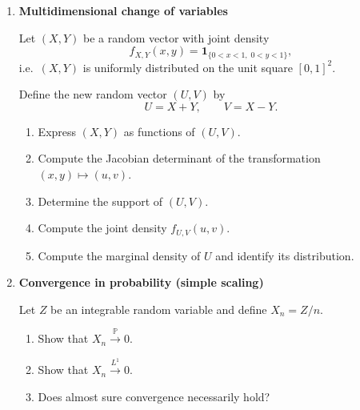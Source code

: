 \documentclass[11pt]{article}
\begin{document}
\begin{enumerate}
Let $R=(R_1,R_2)$ be asset returns with
\[
\mathbb{E}[R]=
\begin{pmatrix}0.05\\0.02\end{pmatrix},
\qquad
\Sigma=
\begin{pmatrix}
0.04 & 0.01\\
0.01 & 0.01
\end{pmatrix}.
\]

A portfolio has weights $w=(0.6,0.4)$.

\begin{enumerate}
\item Compute the expected portfolio return.
\item Compute the portfolio variance.
\item Interpret the effect of correlation.
\end{enumerate}

\bigskip

\item \textbf{Multidimensional change of variables}

Let $(X,Y)$ be a random vector with joint density
\[
f_{X,Y}(x,y)=\mathbf{1}_{\{0<x<1,\;0<y<1\}},
\]
i.e.\ $(X,Y)$ is uniformly distributed on the unit square $[0,1]^2$.

Define the new random vector $(U,V)$ by
\[
U = X+Y,
\qquad
V = X-Y.
\]

\begin{enumerate}
\item Express $(X,Y)$ as functions of $(U,V)$.
\item Compute the Jacobian determinant of the transformation $(x,y)\mapsto(u,v)$.
\item Determine the support of $(U,V)$.
\item Compute the joint density $f_{U,V}(u,v)$.
\item Compute the marginal density of $U$ and identify its distribution.
\end{enumerate}
\item \textbf{Convergence in probability (simple scaling)}

Let $Z$ be an integrable random variable and define $X_n=Z/n$.

\begin{enumerate}
\item Show that $X_n\xrightarrow{\mathbb{P}}0$.
\item Show that $X_n\xrightarrow{L^1}0$.
\item Does almost sure convergence necessarily hold?
\end{enumerate}


\end{enumerate}
\end{document}
